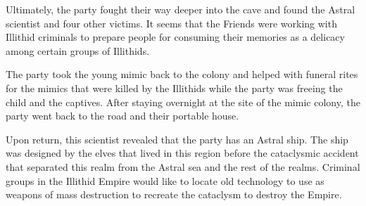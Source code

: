 Ultimately, the party fought their way deeper into the cave and found the Astral scientist and four other victims.
It seems that the Friends were working with Illithid criminals to prepare people for consuming their memories as a delicacy among certain groups of Illithids.

The party took the young mimic back to the colony and helped with funeral rites for the mimics that were killed by the Illithids while the party was freeing the child and the captives.
After staying overnight at the site of the mimic colony, the party went back to the road and their portable house.

Upon return, this scientist revealed that the party has an Astral ship.
The ship was designed by the elves that lived in this region before the cataclysmic accident that separated this realm from the Astral sea and the rest of the realms.
Criminal groups in the Illithid Empire would like to locate old technology to use as weapons of mass destruction to recreate the cataclysm to destroy the Empire.